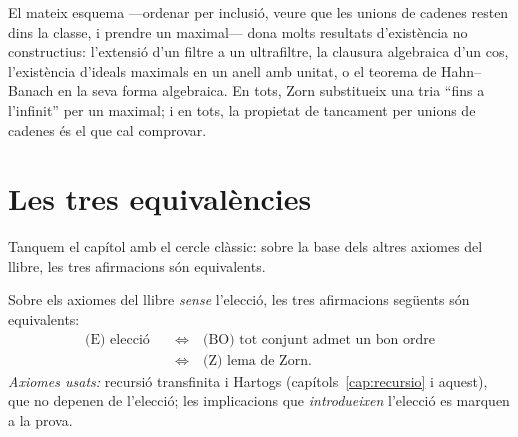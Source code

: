 \begin{observacio}\label{obs:zorn-aplicacions}
El mateix esquema ---ordenar per inclusió, veure que les unions de cadenes
resten dins la classe, i prendre un maximal--- dona molts resultats
d'existència no constructius: l'extensió d'un filtre a un ultrafiltre, la
clausura algebraica d'un cos, l'existència d'ideals maximals en un anell amb
unitat, o el teorema de Hahn--Banach en la seva forma algebraica. En tots,
Zorn substitueix una tria \enquote{fins a l'infinit} per un maximal; i en
tots, la propietat de tancament per unions de cadenes és el que cal
comprovar.
\end{observacio}

\section{Les tres equivalències}\label{sec:equivalencies}

Tanquem el capítol amb el cercle clàssic: sobre la base dels altres axiomes
del llibre, les tres afirmacions són equivalents.

\begin{teorema}\label{teo:equivalencies}
Sobre els axiomes del llibre \emph{sense} l'elecció, les tres afirmacions
següents són equivalents:
\[
\begin{aligned}
\text{(E) elecció}
\quad&\Longleftrightarrow\quad
\text{(BO) tot conjunt admet un bon ordre}\\
&\Longleftrightarrow\quad
\text{(Z) lema de Zorn.}
\end{aligned}
\]
\emph{Axiomes usats:} recursió transfinita i Hartogs
(capítols~\ref{cap:recursio} i aquest), que no depenen de l'elecció; les
implicacions que \emph{introdueixen} l'elecció es marquen a la prova.
\end{teorema}

